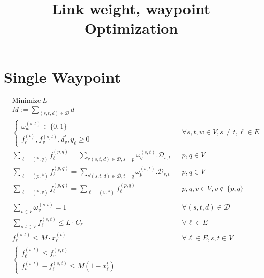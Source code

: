 \documentclass[a4paper,USenglish]{lipics-v2018}
\title{Link weight, waypoint Optimization}
\begin{document}
\maketitle

\section{Single Waypoint}

\begin{align}
& \text{Minimize} ~L \nonumber	&&\\
&M := \sum_{ (s,t,d) \in \mathcal{D}} d &&
\\
&\begin{cases}
\omega^{(s,t)}_{w} \in \{0,1\} \\
f^{(t)}_{\ell}, f^{(s,t)}_{v}, d^{t}_v, y_{\ell}  \geq 0
\end{cases}
&&\forall  s,t,w \in V, s \neq t, \ell \in E \label{LP:vardef}    
\\
&\sum_{\ell = (*,q)} f^{(p,q)}_{\ell}  
	=  \sum_{ \forall (s,t,d) \in \mathcal{D},s=p} \omega^{(s,t)}_{q}.\mathcal{D}_{s,t}
&& p, q \in V
\label{LP:flowsink}
\\
&\sum_{\ell = (p,*)} f^{(p,q)}_{\ell}  
=  \sum_{ \forall (s,t,d) \in \mathcal{D},t=q} \omega^{(s,t)}_{p}.\mathcal{D}_{s,t}
&& p, q \in V
\label{LP:flowsink}
\\
&\sum_{\ell = (*,v)} f^{(p,q)}_{\ell} =
\sum_{\ell= (v,*)}f^{(p,q)}_{\ell} 
&& p,q,v \in V, v \not\in \{p,q\}
\label{LP:flowcons}
\\
&
\\
&\sum_{v \in V}  \omega^{(s,t)}_v = 1
&& \forall (s,t,d) \in \mathcal{D}
\label{LP:wp_limit} 
\\
& \sum_{ s,t \in V} f^{(s,t)}_{\ell} \leq L \cdot C_{\ell}
&& \forall \ell \in E
\\
&   f^{(s,t)}_{\ell} \leq M \cdot x^{(t)}_{\ell}
&& \forall \ell \in E, s,t \in V
\label{LP:SPTree} 
\\
&
\begin{cases*}
f^{(s,t)}_{\ell} \leq f^{(s,t)}_{v}	\\
f^{(s,t)}_{v} - f^{(s,t)}_{\ell} \leq M(1 - x^{t}_{\ell}) 

\end{cases*}
\end{align}
\end{document}
